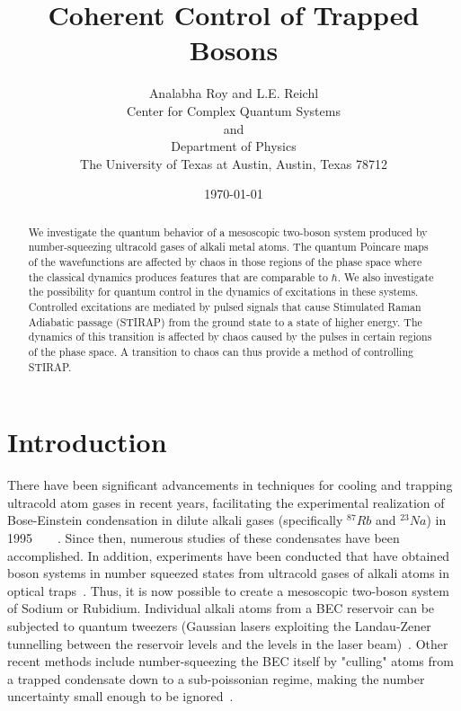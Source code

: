 \documentclass{article}
\begin{document}
\title{Coherent Control of Trapped Bosons}
\author{Analabha Roy and L.E. Reichl \\
Center for Complex Quantum Systems\\
and\\
Department of Physics\\
The University of Texas at Austin, Austin, Texas 78712\\}
\date{\today }
\maketitle

%
\begin{abstract}
%
We investigate the quantum behavior of a mesoscopic two-boson system produced by number-squeezing ultracold gases of alkali metal atoms. The quantum Poincare maps of the wavefunctions are affected by chaos in those regions of the phase space where the classical dynamics produces features that are comparable to $\hbar$. We also investigate the possibility for quantum control in the dynamics of excitations in these systems. Controlled excitations are mediated by pulsed signals that  cause Stimulated Raman Adiabatic passage (STIRAP) from the ground state to a state of higher energy. The dynamics of this transition is affected by chaos caused by the pulses in certain regions of the phase space. A transition to chaos can thus provide a method of controlling STIRAP.
%
\end{abstract}
%
\section{\label{sec:1} Introduction}
%
%

There have been significant advancements in  techniques for cooling and trapping ultracold atom gases in recent years, facilitating the experimental realization of Bose-Einstein condensation in  dilute alkali gases (specifically $^{87}Rb$ and $^{23}Na$) in 1995~\cite{weiman}~\cite{weiman:cornell}~\cite{ketterle}~\cite{ketterle2}. Since then, numerous studies of these condensates have been accomplished. In addition, experiments have been conducted that have obtained boson systems in number squeezed states from ultracold gases of alkali atoms in optical traps~\cite{raizen}. Thus, it is now possible to create a mesoscopic two-boson system of Sodium or Rubidium. Individual alkali atoms from a BEC reservoir can be subjected to quantum tweezers (Gaussian lasers exploiting the Landau-Zener tunnelling between the reservoir levels and the levels in the laser beam)~\cite{diener}. Other recent methods include number-squeezing the BEC itself by "culling" atoms from a trapped condensate down to a sub-poissonian regime, making the number uncertainty small enough to be ignored~\cite{raizen}.
\end{document}
